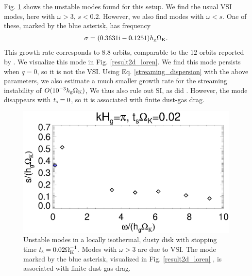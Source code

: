 Fig. \ref{compare_eigenvals_ts0d02} shows the unstable modes found for
this setup. We find the usual VSI modes, here with $\omega> 3,\, s<
0.2$. However, we also find modes with $\omega<s$. One of these,
marked by the blue asterisk, has 
frequency 
\begin{align*}
\sigma = (0.3631\mathrm{i} - 0.1251)h_\mathrm{g}\Omega_{\rm K}. 
\end{align*}
This growth rate corresponds to $8.8$ orbits, comparable to the $12$
orbits reported by \citeauthor{loren15}. We visualize this mode in
Fig. \ref{result2d_loren}. We find this mode 
persists when $q=0$, so it is not the VSI. 
Using Eq. \ref{streaming_dispersion} with the above parameters,  
we also estimate a much smaller growth 
rate for the streaming instability of 
$O(10^{-3}h_\mathrm{g}\Omega_{\rm K})$, We thus also rule out
SI, as did \citeauthor{loren15}. However, the mode disappears with
$t_\mathrm{s}=0$, so it is associated with finite dust-gas drag. 

\begin{figure}
  \includegraphics[width=\linewidth]{figures/compare_eigenvals_ts0d02}
  \caption{Unstable modes in a locally isothermal, dusty disk
    with stopping time  
    $t_\mathrm{s}=0.02\Omega_{\rm K}^{-1}$. Modes with $\omega>3$ are due to
    VSI. The mode marked by the blue asterisk, visualized in
    Fig. \protect\ref{result2d_loren}
    , is associated with finite dust-gas
    drag. 
  }\label{compare_eigenvals_ts0d02}
\end{figure}


